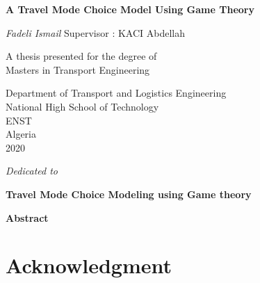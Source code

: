\documentclass[12pt]{report}
\newenvironment{dedication}
  {\clearpage           %
   \thispagestyle{empty}%
   \vspace*{\stretch{1}}%
   \itshape             %
   \raggedleft          %
  }
  {\par %
   \vspace{\stretch{3}} %
   \clearpage           %
  }
\def\blankpage{%
      \clearpage%
      \thispagestyle{empty}%
      \addtocounter{page}{-1}%
      \null%
      \clearpage}
\begin{document}
\begin{titlepage}

   \begin{center}
   \thisfancypage{%
\setlength{\fboxsep}{10pt}\doublebox}{}
       \vspace*{1cm}
 	   \Huge
       \textbf{A Travel Mode Choice Model Using Game Theory}
		\LARGE
		
       \vspace{0.5cm}
        
            
       \vspace{1.5cm}

       \textit{Fadeli Ismail}
\vfill
\normalsize
Supervisor : KACI Abdellah\\

       \vfill
       
            	\normalsize
       A thesis presented for the degree of\\
       Masters in Transport Engineering
            
       \vspace{0.8cm}
     
       
            \Large
       Department of Transport and Logistics Engineering\\
       National High School of Technology \\
       ENST\\
       Algeria\\
       2020
            
   \end{center}
   

\end{titlepage}
\blankpage
\begin{dedication}\thispagestyle{empty}
Dedicated to 
\end{dedication}
\clearpage
\thispagestyle{empty}
\thispagestyle{plain}
\begin{center}
    \Large
    \textbf{Travel Mode Choice Modeling using Game theory}
        
    \vspace{0.4cm}
    \large
   
        
    \vspace{0.4cm}
    
       
    \vspace{0.9cm}
    \textbf{Abstract}
\end{center}

\clearpage
\section*{Acknowledgment}\thispagestyle{empty}
\clearpage
\tableofcontents \thispagestyle{empty}
\listoffigures
\listoftables
{}
\clearpage
\end{document}
